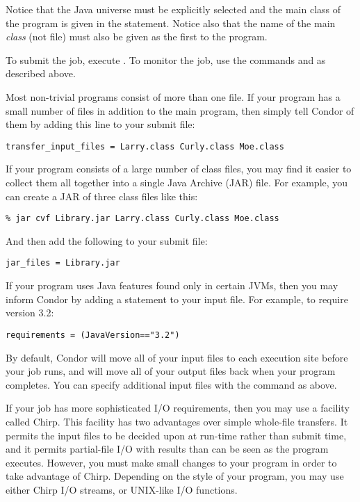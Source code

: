 Notice that the Java universe must be explicitly selected and the main class
of the program is given in the  statement.  Notice also that
the name of the main \emph{class} (not file) must also be given as the first
 to the program.

To submit the job, execute  .
To monitor the job, use the commands  and 
as described above.

Most non-trivial programs consist of more than one  file.
If your program has a small number of  files in addition
to the main program, then simply tell Condor of them by adding
this line to your submit file:

\begin{verbatim}
transfer_input_files = Larry.class Curly.class Moe.class
\end{verbatim}

If your program consists of a large number of class files,
you may find it easier to collect them all together into
a single Java Archive (JAR) file.  For example, you
can create a JAR of three class files like this:

\begin{verbatim}
% jar cvf Library.jar Larry.class Curly.class Moe.class
\end{verbatim}

And then add the following to your submit file:

\begin{verbatim}
jar_files = Library.jar
\end{verbatim}

If your program uses Java features found only in certain
JVMs, then you may inform Condor by adding a 
statement to your input file.  For example, to require
version 3.2:

\begin{verbatim}
requirements = (JavaVersion=="3.2")
\end{verbatim}

By default, Condor will move all of your input files
to each execution site before your job runs, and will move
all of your output files back when your program completes.
You can specify additional input files with the 
 command as above.

If your job has more sophisticated I/O requirements, then
you may use a facility called Chirp.  This facility
has two advantages over simple whole-file transfers.
It permits the input files to be decided upon at run-time
rather than submit time, and it permits partial-file I/O
with results than can be seen as the program executes.
However, you must make small changes to your program
in order to take advantage of Chirp.  Depending on the
style of your program, you may use either Chirp I/O streams,
or UNIX-like I/O functions.

